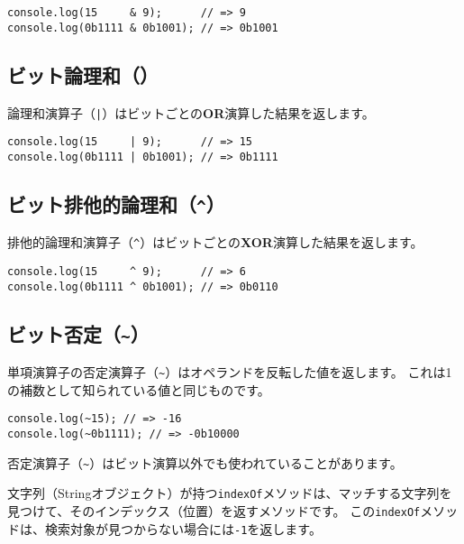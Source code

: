 \begin{lstlisting}
console.log(15     & 9);      // => 9
console.log(0b1111 & 0b1001); // => 0b1001
\end{lstlisting}

\hypertarget{bit-or}{%
\subsection{\texorpdfstring{ビット論理和（\texttt{\textbar{}}）}{ビット論理和（\textbar{}）}}\label{bit-or}}

論理和演算子（\texttt{|}）はビットごとの\textbf{OR}演算した結果を返します。

\begin{lstlisting}
console.log(15     | 9);      // => 15
console.log(0b1111 | 0b1001); // => 0b1111
\end{lstlisting}

\hypertarget{bit-xor}{%
\subsection{\texorpdfstring{ビット排他的論理和（\texttt{\^{}}）}{ビット排他的論理和（\^{}）}}\label{bit-xor}}

排他的論理和演算子（\texttt{\^{}}）はビットごとの\textbf{XOR}演算した結果を返します。

\begin{lstlisting}
console.log(15     ^ 9);      // => 6
console.log(0b1111 ^ 0b1001); // => 0b0110
\end{lstlisting}

\hypertarget{bit-not}{%
\subsection{\texorpdfstring{ビット否定（\texttt{\textasciitilde{}}）}{ビット否定（\textasciitilde{}）}}\label{bit-not}}

単項演算子の否定演算子（\lstinline{~}）はオペランドを反転した値を返します。
これは1の補数として知られている値と同じものです。

\begin{lstlisting}
console.log(~15); // => -16
console.log(~0b1111); // => -0b10000
\end{lstlisting}

否定演算子（\lstinline{~}）はビット演算以外でも使われていることがあります。

文字列（Stringオブジェクト）が持つ\texttt{indexOf}メソッドは、マッチする文字列を見つけて、そのインデックス（位置）を返すメソッドです。
この\texttt{indexOf}メソッドは、検索対象が見つからない場合には\texttt{-1}を返します。

